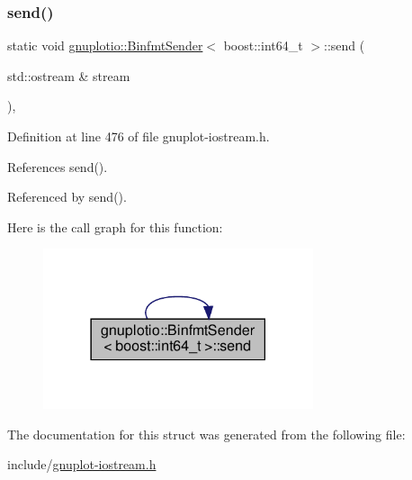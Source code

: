 \subsubsection{\texorpdfstring{send()}{send()}}
{\footnotesize\ttfamily static void \hyperlink{structgnuplotio_1_1_binfmt_sender}{gnuplotio\+::\+Binfmt\+Sender}$<$ boost\+::int64\+\_\+t $>$\+::send (\begin{DoxyParamCaption}\item[{std\+::ostream \&}]{stream }\end{DoxyParamCaption})\hspace{0.3cm}{\ttfamily [inline]}, {\ttfamily [static]}}



Definition at line 476 of file gnuplot-\/iostream.\+h.



References send().



Referenced by send().

Here is the call graph for this function\+:\nopagebreak
\begin{figure}[H]
\begin{center}
\leavevmode
\includegraphics[width=225pt]{structgnuplotio_1_1_binfmt_sender_3_01boost_1_1int64__t_01_4_a57423f02a4526e15d7d821606b1c8c81_cgraph}
\end{center}
\end{figure}


The documentation for this struct was generated from the following file\+:\begin{DoxyCompactItemize}
\item 
include/\hyperlink{gnuplot-iostream_8h}{gnuplot-\/iostream.\+h}\end{DoxyCompactItemize}

